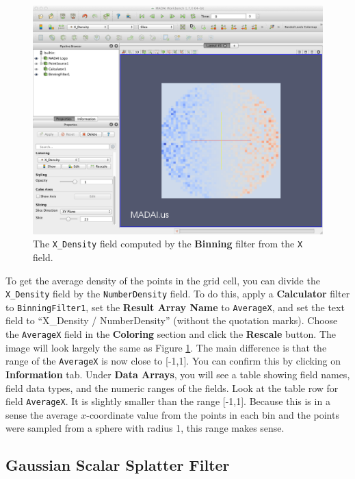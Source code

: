 \documentclass[12pt]{article}
\newcommand{\filter}[1]{\textbf{#1}}
\newcommand{\filterinstance}[1]{\texttt{#1}}
\newcommand{\setting}[1]{\textbf{#1}}
\newcommand{\field}[1]{\texttt{#1}}
\begin{document}
\begin{figure}[htbp]
   \centering
   \includegraphics[scale=.25]{images/BinningFilter_XDensity.png} %
   \caption{The \texttt{X\_Density} field computed by the \textbf{Binning} filter from the \texttt{X} field.}
   \label{fig:BinningFilterXDensity}
\end{figure}

To get the average density of the points in the grid cell, you can divide the \field{X\_Density} field by the \field{NumberDensity} field. To do this, apply a \filter{Calculator} filter to \filterinstance{BinningFilter1}, set the \setting{Result Array Name} to \field{AverageX}, and set the text field to ``X\_Density / NumberDensity'' (without the quotation marks).  Choose the \field{AverageX} field in the \setting{Coloring} section and click the \setting{Rescale} button. The image will look largely the same as Figure \ref{fig:BinningFilterXDensity}. The main difference is that the range of the \field{AverageX} is now close to [-1,1]. You can confirm this by clicking on \textbf{Information} tab. Under \setting{Data Arrays}, you will see a table showing field names, field data types, and the numeric ranges of the fields. Look at the table row for field \field{AverageX}. It is slightly smaller than the range [-1,1]. Because this is in a sense the average $x$-coordinate value from the points in each bin and the points were sampled from a sphere with radius 1, this range makes sense. 

\subsection{Gaussian Scalar Splatter Filter}
\end{document}

